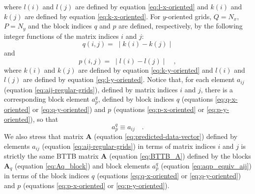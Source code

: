 where $l(i)$ and $l(j)$ are defined by equation \ref{eq:l-x-oriented} 
and $k(i)$ and $k(j)$ are defined by equation \ref{eq:k-x-oriented}.
For $y$-oriented grids, $Q = N_{x}$, $P = N_{y}$ and the block indices
$q$ and $p$ are defined, respectively, by the following integer functions 
of the matrix indices $i$ and $j$:
\begin{equation}
q(i, j) = \; \mid k(i) - k(j) \mid 
\label{eq:q-y-oriented}
\end{equation}
and
\begin{equation}
p(i, j) = \; \mid l(i) - l(j) \mid \quad ,
\label{eq:p-y-oriented}
\end{equation}
where $k(i)$ and $k(j)$ are defined by equation \ref{eq:k-y-oriented}
and $l(i)$ and $l(j)$ are defined by equation \ref{eq:l-y-oriented}.
Notice that, for each element $a_{ij}$ (equation \ref{eq:aij-regular-grids}),
defined by matrix indices $i$ and $j$, there is a corresponding block element
$a^{q}_{p}$, defined by block indices $q$ (equations \ref{eq:q-x-oriented} or 
\ref{eq:q-y-oriented}) and $p$ (equations \ref{eq:p-x-oriented} or \ref{eq:p-y-oriented}),
so that
\begin{equation}
	a^{q}_{p} \equiv a_{ij} \quad .
	\label{eq:aqp_equiv_aij}
\end{equation}
We also stress that matrix $\mathbf{A}$ (equation \ref{eq:predicted-data-vector}) defined 
by elements $a_{ij}$ (equation \ref{eq:aij-regular-grids}) in terms of matrix indices 
$i$ and $j$ is strictly the same BTTB matrix $\mathbf{A}$ (equation \ref{eq:BTTB_A}) defined 
by the blocks $\mathbf{A}_{q}$ (equation \ref{eq:Aq_block}) and block elements 
$a^{q}_{p}$ (equation \ref{eq:aqp_equiv_aij}) in terms of the block indices 
$q$ (equations \ref{eq:q-x-oriented} or \ref{eq:q-y-oriented}) and $p$ 
(equations \ref{eq:p-x-oriented} or \ref{eq:p-y-oriented}).

